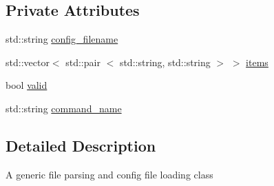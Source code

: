 \subsection*{\-Private \-Attributes}
\begin{DoxyCompactItemize}
\item 
std\-::string \hyperlink{classPSR_1_1Parser_af6881b6cd3d70d39a3a751b5dcf794e1}{config\-\_\-filename}
\item 
std\-::vector$<$ std\-::pair\*
$<$ std\-::string, std\-::string $>$ $>$ \hyperlink{classPSR_1_1Parser_aef76f91df7efa2b90449de2a2fe2bd14}{items}
\item 
bool \hyperlink{classPSR_1_1Parser_a2b9ecb5e358711e71000893a4246c9c3}{valid}
\item 
std\-::string \hyperlink{classPSR_1_1Parser_a1c3ab112c2c5c73d1df9f505b4bb4ecd}{command\-\_\-name}
\end{DoxyCompactItemize}


\subsection{\-Detailed \-Description}
\-A generic file parsing and config file loading class 

